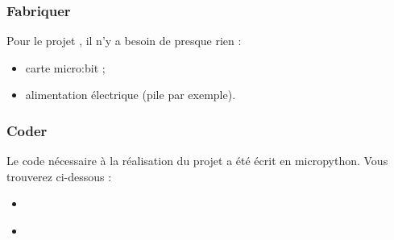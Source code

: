 \documentclass[letterpaper,10pt,french]{sphinxmanual}
\begin{document}
\subsubsection{Fabriquer}
\label{\detokenize{projets/temperature-fabriquer:projettempfabriquer}}\label{\detokenize{projets/temperature-fabriquer::doc}}\label{\detokenize{projets/temperature-fabriquer:fabriquer}}
Pour le projet {\hyperref[\detokenize{projets/temperature:projettemp}]{}}, il n’y a besoin de presque rien :
\begin{itemize}
\item {} 
carte micro:bit ;

\item {} 
alimentation électrique (pile par exemple).

\end{itemize}
\label{\detokenize{projets/temperature-coder:projettempcoder}}
\ignorespaces 

\subsubsection{Coder}
\label{\detokenize{projets/temperature-coder:index-0}}\label{\detokenize{projets/temperature-coder:coder}}\label{\detokenize{projets/temperature-coder::doc}}
Le code nécessaire à la réalisation du projet {\hyperref[\detokenize{projets/temperature:projettemp}]{}} a été
écrit en micropython. Vous trouverez ci-dessous :
\begin{itemize}
\item {} 
{\hyperref[\detokenize{projets/temperature-coder:le-code-etape-par-etape}]{}}

\item {} 
{\hyperref[\detokenize{projets/temperature-coder:le-code-final}]{}}

\end{itemize}
\end{document}
